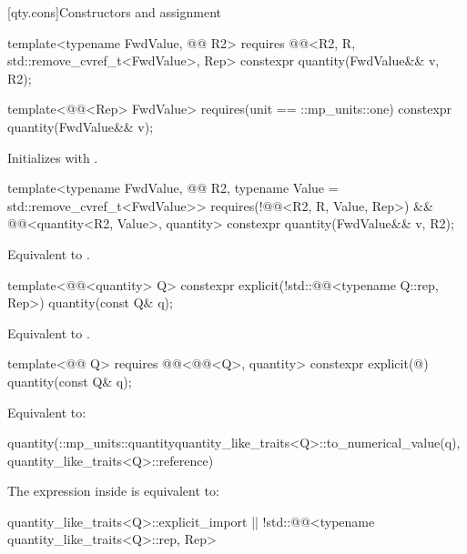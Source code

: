 [qty.cons]{Constructors and assignment}

\begin{itemdecl}
template<typename FwdValue, @@ R2>
  requires @@<R2{}, R, std::remove_cvref_t<FwdValue>, Rep>
constexpr quantity(FwdValue&& v, R2);

template<@@<Rep> FwdValue>
  requires(unit == ::mp_units::one)
constexpr quantity(FwdValue&& v);
\end{itemdecl}

\begin{itemdescr}
\pnum
\effects
Initializes  with .
\end{itemdescr}

\begin{itemdecl}
template<typename FwdValue, @@ R2, typename Value = std::remove_cvref_t<FwdValue>>
  requires(!@@<R2{}, R, Value, Rep>) &&
          @@<quantity<R2{}, Value>, quantity>
constexpr quantity(FwdValue&& v, R2);
\end{itemdecl}

\begin{itemdescr}
\pnum
\effects
Equivalent to
.
\end{itemdescr}

\begin{itemdecl}
template<@@<quantity> Q>
constexpr explicit(!std::@@<typename Q::rep, Rep>) quantity(const Q& q);
\end{itemdecl}

\begin{itemdescr}
\pnum
\effects
Equivalent to .
\end{itemdescr}

\begin{itemdecl}
template<@@ Q>
  requires @@<@@<Q>, quantity>
constexpr explicit(@\seebelownc@) quantity(const Q& q);
\end{itemdecl}

\begin{itemdescr}
\pnum
\effects
Equivalent to:
\begin{codeblock}
quantity(::mp_units::quantity{quantity_like_traits<Q>::to_numerical_value(q),
                              quantity_like_traits<Q>::reference})
\end{codeblock}

\pnum
\remarks
The expression inside  is equivalent to:
\begin{codeblock}
quantity_like_traits<Q>::explicit_import ||
  !std::@@<typename quantity_like_traits<Q>::rep, Rep>
\end{codeblock}
\end{itemdescr}

